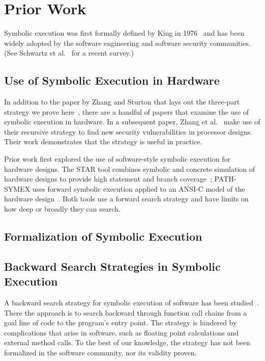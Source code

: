 \section{Prior Work}
Symbolic execution was first formally defined by King in 1976~\cite{king1976symbolic} and has
been widely adopted by the software engineering and software security
communities. (See Schwartz et al.~\cite{schwartz2010all} for a recent survey.)

\subsection{Use of Symbolic Execution in Hardware}
In addition to the paper by Zhang and Sturton that lays out the three-part
strategy we prove here~\cite{zhang2018recursive}, there are a handful of papers that examine
the use of symbolic execution in hardware. In a subsequent paper, Zhang et
al.~\cite{zhang2018recursive} make use of their recursive strategy to find new security
vulnerabilities in processor designs. Their work demonstrates that the strategy
is useful in practice.

Prior work first explored the use of software-style symbolic execution for hardware designs. The STAR tool combines symbolic and concrete simulation of hardware designs to
provide high statement and branch coverage~\cite{liu2009star}; PATH-SYMEX uses
forward symbolic execution applied to an ANSI-C model of the hardware
design~\cite{mukherjee2015hardware}. Both tools use a forward search strategy
and have limits on how deep or broadly they can search.

\subsection{Formalization of Symbolic Execution}
\subsection{Backward Search Strategies in Symbolic Execution}

A backward search strategy for symbolic execution of software has been
studied~\cite{ma2011directed,chandra09,dinges04,charreteur10}. There the approach is to search
backward through function call chains from a goal line of code to the program's
entry point. The strategy is hindered by complications that arise in software,
such as floating point calculations and external method calls. To the best of our knowledge, the strategy has not been formalized
in the software community, nor its validity proven. 

